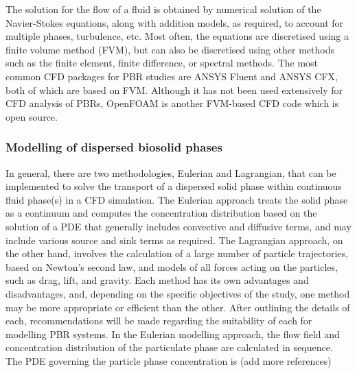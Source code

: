 The solution for the flow of a fluid is obtained by numerical solution of the Navier-Stokes equations, along with addition models, as required, to account for multiple phases, turbulence, etc. Most often, the equations are discretised using a finite volume method (FVM), but can also be discretised using other methods such as the finite element, finite difference, or spectral methods.  The most common CFD packages for PBR studies are ANSYS Fluent and ANSYS CFX, both of which are based on FVM.  Although it has not been used extensively for CFD analysis of PBRs, OpenFOAM is another FVM-based CFD code which is open source.





\subsubsection{Modelling of dispersed biosolid phases}
\label{S:21}

In general, there are two methodologies, Eulerian and Lagrangian, that can be implemented to solve the transport of a dispersed solid phase within continuous fluid phase(s) in a CFD simulation. The Eulerian approach treats the solid phase as a continuum and computes the concentration distribution based on the solution of a PDE that generally includes convective and diffusive terms, and may include various source and sink terms as required.  The Lagrangian approach, on the other hand, involves the calculation of a large number of particle trajectories, based on Newton's second law, and models of all forces acting on the particles, such as drag, lift, and gravity. Each method has its own advantages and disadvantages, and, depending on the specific objectives of the study, one method may be more appropriate or efficient than the other.  After outlining the details of each, recommendations will be made regarding the suitability of each for modelling PBR systems.
\skippingparagraph
In the Eulerian modelling approach, the flow field and concentration distribution of the particulate phase are calculated in sequence.  The PDE governing the particle phase concentration is \cite{zhang2007} (add more references)

